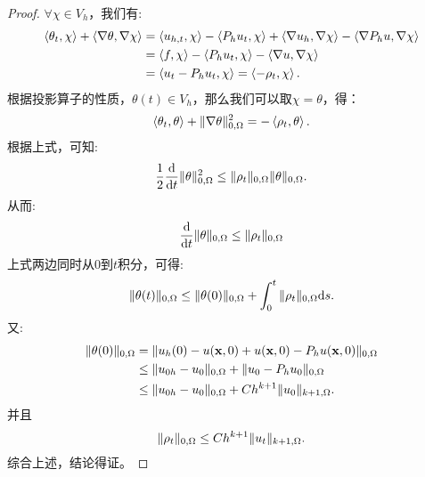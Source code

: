 \begin{proof}
    $\forall \chi\in V_{h}$，我们有:
    \begin{equation}
        \begin{aligned}
            \left<\theta_{t},\chi\right>+\left<\nabla\theta,\nabla\chi\right>&=\left<u_{h,t},\chi\right>-\left<P_{h}u_{t},\chi\right>+\left<\nabla u_{h},\nabla\chi\right>-\left<\nabla P_{h}u,\nabla\chi\right>\\
            &=\left<f,\chi\right>-\left<P_{h}u_{t},\chi\right>-\left<\nabla u,\nabla \chi\right>\\
            &=\left<u_{t}-P_{h}u_{t},\chi\right>=\left<-\rho_{t},\chi\right>.
        \end{aligned}
    \end{equation}
    根据投影算子的性质，$\theta(t)\in V_{h}$，那么我们可以取$\chi=\theta$，得：
    \begin{equation}
        \left<\theta_{t},\theta\right>+\|\nabla\theta\|_{0,\Omega}^{2}=-\left<\rho_{t},\theta\right>.
    \end{equation}
    根据上式，可知:
    \begin{equation}
        \frac{1}{2}\frac{\mathrm{d} }{\mathrm{d} t}\|\theta\|_{0,\Omega}^{2}\le\|\rho_{t}\|_{0,\Omega}\|\theta\|_{0,\Omega}.
    \end{equation}
    从而:
    \begin{equation}
        \frac{\mathrm{d} }{\mathrm{d} t}\|\theta\|_{0,\Omega}\le\|\rho_{t}\|_{0,\Omega}
    \end{equation}
    上式两边同时从$0$到$t$积分，可得:
    \begin{equation}
        \|\theta(t)\|_{0,\Omega}\le \|\theta(0)\|_{0,\Omega}+\int_{0}^{t}\|\rho_{t}\|_{0,\Omega}\mathrm{d} s.
    \end{equation}
    又:
    \begin{equation}
        \begin{aligned}
            \|\theta(0)\|_{0,\Omega}&=\|u_{h}(0)-u(\mathbf{x},0)+u(\mathbf{x},0)-P_{h}u(\mathbf{x},0)\|_{0,\Omega}\\
            &\le\|u_{0h}-u_{0}\|_{0,\Omega}+\|u_{0}-P_{h}u_{0}\|_{0,\Omega}\\
            &\le\|u_{0h}-u_{0}\|_{0,\Omega}+Ch^{k+1}\|u_{0}\|_{k+1,\Omega}.
        \end{aligned}
    \end{equation}
    并且
    \begin{equation}
        \|\rho_{t}\|_{0,\Omega}\le Ch^{k+1}\|u_{t}\|_{k+1,\Omega}.
    \end{equation}
    综合上述，结论得证。
\end{proof}

